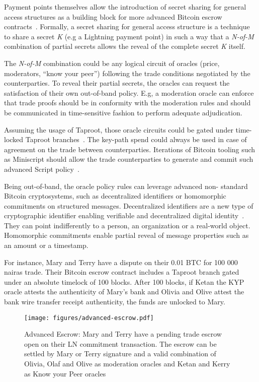 \documentclass[pdflatex,sn-mathphys]{sn-jnl}%
\theoremstyle{thmstyleone}%
\theoremstyle{thmstyletwo}%
\theoremstyle{thmstylethree}%
\begin{document}
Payment points themselves allow the introduction of secret sharing for general access structures as a building block for more advanced Bitcoin escrow contracts~\cite{Points2019Kohen}. Formally, a secret sharing for general access structure is a technique to share a secret \textit{K} (e.g a Lightning payment point) in such a way that a \textit{N-of-M} combination of partial secrets allows the reveal of the complete secret \textit{K} itself.

The \textit{N-of-M} combination could be any logical circuit of oracles (price, moderators, “know your peer”) following the trade conditions negotiated by the counterparties. To reveal their partial secrets, the oracles can request the satisfaction of their own out-of-band policy. E.g, a moderation oracle can enforce that trade proofs should be in conformity with the moderation rules and should be communicated in time-sensitive fashion to perform adequate adjudication.

Assuming the usage of Taproot, those oracle circuits could be gated under time-locked Taproot branches~\cite{Taproot2020Wuille}. The key-path spend could always be used in case of agreement on the trade between counterparties. Iterations of Bitcoin tooling such as Miniscript should allow the trade counterparties to generate and commit such advanced Script policy~\cite{Miniscript2019Wuille}.

Being out-of-band, the oracle policy rules can leverage advanced non- standard Bitcoin cryptosystems, such as decentralized identifiers or homomorphic commitments on structured messages. Decentralized identifiers are a new type of cryptographic identifier enabling verifiable and decentralized digital identity~\cite{DID2022W3C}. They can point indifferently to a person, an organization or a real-world object. Homomorphic commitments enable partial reveal of message properties such as an amount or a timestamp.

For instance, Mary and Terry have a dispute on their 0.01 BTC for 100 000 nairas trade. Their Bitcoin escrow contract includes a Taproot branch gated under an absolute timelock of 100 blocks. After 100 blocks, if Ketan the KYP oracle attests the authenticity of Mary’s bank and Olivia and Olive attest the bank wire transfer receipt authenticity, the funds are unlocked to Mary.

\begin{figure}[h]
    \centering
    \texttt{[image: figures/advanced-escrow.pdf]}
    \caption{Advanced Escrow: Mary and Terry have a pending trade escrow open on their LN commitment transaction. The escrow can be settled by Mary or Terry signature and a valid combination of Olivia, Olaf and Olive as moderation oracles and Ketan and Kerry as Know your Peer oracles}
    \label{fig:advanced_escrow}
\end{figure}
\end{document}
